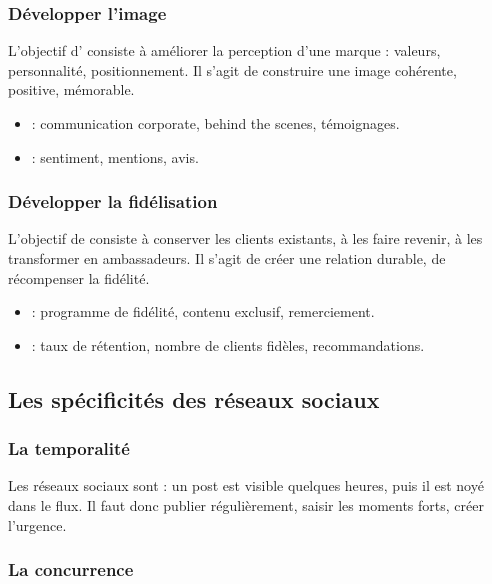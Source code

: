 \subsubsection{Développer l'image}

L'objectif d' consiste à améliorer la perception d'une marque : valeurs, personnalité, positionnement. Il s'agit de construire une image cohérente, positive, mémorable.

\begin{itemize}
    \item {} : communication corporate, behind the scenes, témoignages.
    \item {} : sentiment, mentions, avis.
\end{itemize}

\subsubsection{Développer la fidélisation}

L'objectif de  consiste à conserver les clients existants, à les faire revenir, à les transformer en ambassadeurs. Il s'agit de créer une relation durable, de récompenser la fidélité.

\begin{itemize}
    \item {} : programme de fidélité, contenu exclusif, remerciement.
    \item {} : taux de rétention, nombre de clients fidèles, recommandations.
\end{itemize}

\subsection{Les spécificités des réseaux sociaux}

\subsubsection{La temporalité}

Les réseaux sociaux sont  : un post est visible quelques heures, puis il est noyé dans le flux. Il faut donc publier régulièrement, saisir les moments forts, créer l'urgence.

\subsubsection{La concurrence}

